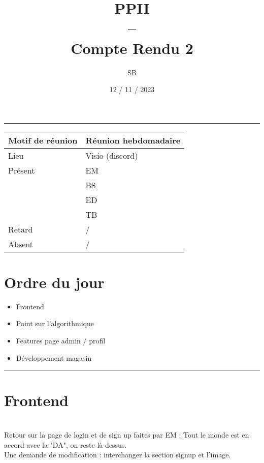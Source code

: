 \documentclass[10pt,a4paper]{report}
\title{PPII \\ -- \\ Compte Rendu 2}
\date{12 / 11 / 2023}
\author{SB}
\begin{document}
\maketitle

\tableofcontents \bigskip

\rule{\linewidth}{0.5mm} \bigskip

                \begin{tabular}{|l | l|}
                        \hline
                Motif de réunion & Réunion hebdomadaire \\
                        \hline
                Lieu & Visio (discord) \\
                        \hline
                Présent & EM \\
                        & BS \\
                        & ED \\
                        & TB  \\
                        \hline
                Retard  & / \\
                        \hline
                Absent  & / \\
                        \hline
                \end{tabular}


\section{Ordre du jour}
\begin{itemize}
        \item Frontend
        \item Point sur l'algorithmique
        \item Features page admin / profil
        \item Développement magasin
\end{itemize}

\rule{\linewidth}{0.5mm} \bigskip
\section{Frontend}
\ \\

Retour sur la page de login et de sign up faites par EM : Tout le monde est en accord avec la "DA", on reste là-dessus. \\

Une demande de modification : interchanger la section signup et l'image. \\
\end{document}
